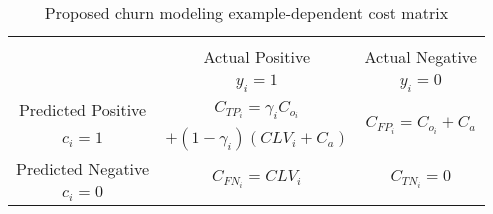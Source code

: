   \begin{table}[htbp]
	  \centering
	  \footnotesize
     \begin{tabular}{c|c|c}
        \multicolumn{3}{c}{}\\
			\multicolumn{1}{c|}{}  & Actual Positive& Actual Negative \\
			\multicolumn{1}{c|}{} & $y_i=1$& $y_i=0$ \\
			\hline
			Predicted Positive 		& $C_{TP_i}=\gamma_iC_{o_i}$ & 
\multirow{2}{*}{$C_{FP_i}=C_{o_i}+C_a$}\\
			$c_i=1$ & $+(1-\gamma_i)(CLV_i+C_a)$ &\\
			\hline
			Predicted Negative  	& \multirow{ 2}{*}{$C_{FN_i}=CLV_i$} & \multirow{ 
			2}{*}{$C_{TN_i}=0$} \\
			$c_i=0$ & &\\
		\end{tabular}
		\caption{Proposed churn modeling example-dependent cost matrix}
    \label{tab:ch4:1}
  \end{table}

